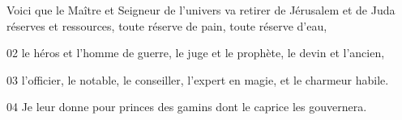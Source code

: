 Voici que le Maître et Seigneur de l’univers va retirer de Jérusalem et de Juda réserves et ressources, toute réserve de pain, toute réserve d’eau,

02 le héros et l’homme de guerre, le juge et le prophète, le devin et l’ancien,

03 l’officier, le notable, le conseiller, l’expert en magie, et le charmeur habile.

04 Je leur donne pour princes des gamins dont le caprice les gouvernera.
